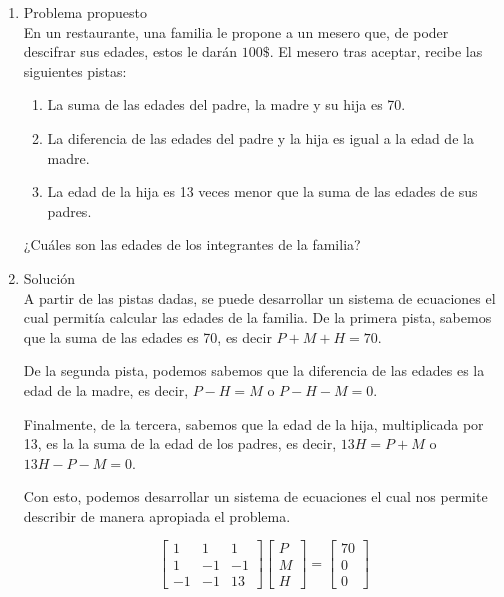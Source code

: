 \documentclass[english,notitlepage,letterpaper, 10pt]{article} %
\begin{document}
\begin{enumerate}
        \begin{enumerate}
          \item Problema propuesto \\
            En un restaurante, una familia le propone a un mesero que, de poder descifrar sus edades, estos le darán $100\$$. El mesero tras aceptar, recibe las siguientes pistas:
              \begin{enumerate}
                \item La suma de las edades del padre, la madre y su hija es 70.
                \item La diferencia de las edades del padre y la hija es igual a la edad de la madre.
                \item La edad de la hija es 13 veces menor que la suma de las edades de sus padres.
              \end{enumerate}
              ¿Cuáles son las edades de los integrantes de la familia?
          \item Solución \\
            A partir de las pistas dadas, se puede desarrollar un sistema de ecuaciones el cual permitía calcular las edades de la familia. De la primera pista, sabemos que la suma de las edades es 70, es decir $P + M + H = 70$. 

            De la segunda pista, podemos sabemos que la diferencia de las edades es la edad de la madre, es decir, $P - H = M$ o $P - H - M = 0$.

            Finalmente, de la tercera, sabemos que la edad de la hija, multiplicada por 13, es la la suma de la edad de los padres, es decir, $13H = P + M$ o $13H - P - M = 0$.

            Con esto, podemos desarrollar un sistema de ecuaciones el cual nos permite describir de manera apropiada el problema.

            \begin{displaymath}
              \begin{bmatrix}
                1 & 1 & 1 \\
                1 & -1 & -1 \\
                -1 & -1 & 13
              \end{bmatrix}
              \begin{bmatrix}
                P \\
                M \\
                H
              \end{bmatrix}
              = 
              \begin{bmatrix}
                70 \\
                0  \\ 
                0
              \end{bmatrix}
            \end{displaymath}


\end{enumerate}
\end{enumerate}
\end{document}
